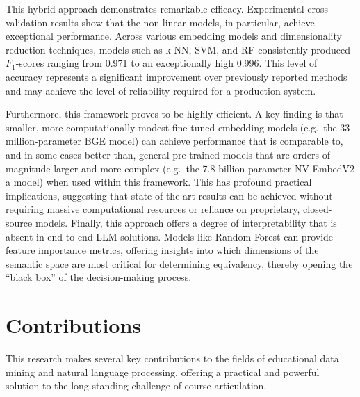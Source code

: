 \begin{introduction}
This hybrid approach demonstrates remarkable efficacy. Experimental cross-validation results show that the non-linear models, in particular, achieve exceptional performance. Across various embedding models and dimensionality reduction techniques, models such as k-NN, SVM, and RF consistently produced \(F_1\)-scores ranging from 0.971 to an exceptionally high 0.996. This level of accuracy represents a significant improvement over previously reported methods and may achieve the level of reliability required for a production system.

Furthermore, this framework proves to be highly efficient. A key finding is that smaller, more computationally modest fine-tuned embedding models (e.g.\ the 33-million-parameter BGE model) can achieve performance that is comparable to, and in some cases better than, general pre-trained models that are orders of magnitude larger and more complex (e.g.\ the 7.8-billion-parameter NV-EmbedV2 a model) when used within this framework.  This has profound practical implications, suggesting that state-of-the-art results can be achieved without requiring massive computational resources or reliance on proprietary, closed-source models. Finally, this approach offers a degree of interpretability that is absent in end-to-end LLM solutions. Models like Random Forest can provide feature importance metrics, offering insights into which dimensions of the semantic space are most critical for determining equivalency, thereby opening the ``black box'' of the decision-making process.

\section{Contributions}
This research makes several key contributions to the fields of educational data mining and natural language processing, offering a practical and powerful solution to the long-standing challenge of course articulation.


\end{introduction}
